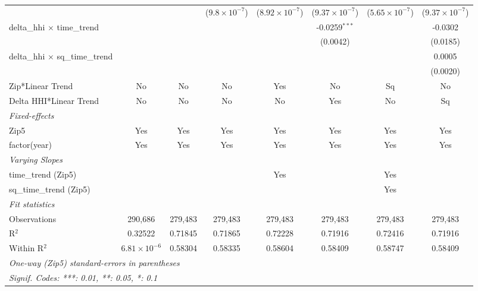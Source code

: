 \begin{table}[H]
{\begin{tabular}{lccccccc}
   &   &    & ($9.8\times 10^{-7}$) & ($8.92\times 10^{-7}$) & ($9.37\times 10^{-7}$) & ($5.65\times 10^{-7}$) & ($9.37\times 10^{-7}$)\\ 

 delta\_hhi $\times $ time\_trend&   &    &    &    & -0.0259$^{***}$ &    & -0.0302\\ 

   &   &    &    &    & (0.0042) &    & (0.0185)\\ 

 delta\_hhi $\times $ sq\_time\_trend&   &    &    &    &    &    & 0.0005\\ 

   &   &    &    &    &    &    & (0.0020)\\ 

 Zip*Linear Trend & No & No & No & Yes & No & Sq & No\\ 

 Delta HHI*Linear Trend & No & No & No & No & Yes & No & Sq\\ 

 \midrule \emph{Fixed-effects}&   &   &   &   &   &   &  \\ 

 Zip5 & Yes & Yes & Yes & Yes & Yes & Yes & Yes\\ 

 factor(year) & Yes & Yes & Yes & Yes & Yes & Yes & Yes\\ 

 \midrule \emph{Varying Slopes}&   &   &   &   &   &   &  \\ 

 time\_trend (Zip5) &  &  &  & Yes &  & Yes & \\ 

 sq\_time\_trend (Zip5) &  &  &  &  &  & Yes & \\ 

 \midrule \emph{Fit statistics}&  & & & & & & \\ 

 Observations & 290,686&279,483&279,483&279,483&279,483&279,483&279,483\\ 

 R$^2$ & 0.32522&0.71845&0.71865&0.72228&0.71916&0.72416&0.71916\\ 

 Within R$^2$ & $6.81\times 10^{-6}$&0.58304&0.58335&0.58604&0.58409&0.58747&0.58409\\ 

 \midrule\midrule\multicolumn{8}{l}{\emph{One-way (Zip5) standard-errors in parentheses}}\\ 

 \multicolumn{8}{l}{\emph{Signif. Codes: ***: 0.01, **: 0.05, *: 0.1}}\\ 

 \end{tabular}} 

 \end{table} 


